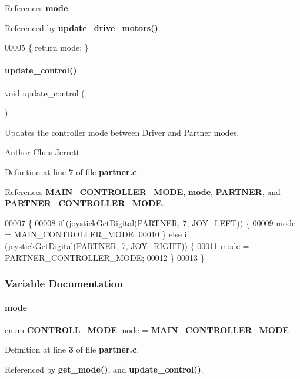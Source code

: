 References \textbf{ mode}.



Referenced by \textbf{ update\+\_\+drive\+\_\+motors()}.


\begin{DoxyCode}
00005 \{ \textcolor{keywordflow}{return} mode; \}
\end{DoxyCode}
\mbox{\label{a00137_ab2c78903a76d2ed8969271803c78368a}} 
\paragraph{update\+\_\+control()}
{\footnotesize\ttfamily void update\+\_\+control (\begin{DoxyParamCaption}{ }\end{DoxyParamCaption})}



Updates the controller mode between Driver and Partner modes. 

\begin{DoxyAuthor}{Author}
Chris Jerrett 
\end{DoxyAuthor}


Definition at line \textbf{ 7} of file \textbf{ partner.\+c}.



References \textbf{ M\+A\+I\+N\+\_\+\+C\+O\+N\+T\+R\+O\+L\+L\+E\+R\+\_\+\+M\+O\+DE}, \textbf{ mode}, \textbf{ P\+A\+R\+T\+N\+ER}, and \textbf{ P\+A\+R\+T\+N\+E\+R\+\_\+\+C\+O\+N\+T\+R\+O\+L\+L\+E\+R\+\_\+\+M\+O\+DE}.


\begin{DoxyCode}
00007                       \{
00008   \textcolor{keywordflow}{if} (joystickGetDigital(PARTNER, 7, JOY\_LEFT)) \{
00009     mode = MAIN_CONTROLLER_MODE;
00010   \} \textcolor{keywordflow}{else} \textcolor{keywordflow}{if} (joystickGetDigital(PARTNER, 7, JOY\_RIGHT)) \{
00011     mode = PARTNER_CONTROLLER_MODE;
00012   \}
00013 \}
\end{DoxyCode}


\subsubsection{Variable Documentation}
\mbox{\label{a00137_ac57f7e8cb1c4e638c8c477740314a109}} 
\paragraph{mode}
{\footnotesize\ttfamily enum \textbf{ C\+O\+N\+T\+R\+O\+L\+L\+\_\+\+M\+O\+DE} mode = \textbf{ M\+A\+I\+N\+\_\+\+C\+O\+N\+T\+R\+O\+L\+L\+E\+R\+\_\+\+M\+O\+DE}\hspace{0.3cm}{\ttfamily [static]}}



Definition at line \textbf{ 3} of file \textbf{ partner.\+c}.



Referenced by \textbf{ get\+\_\+mode()}, and \textbf{ update\+\_\+control()}.

